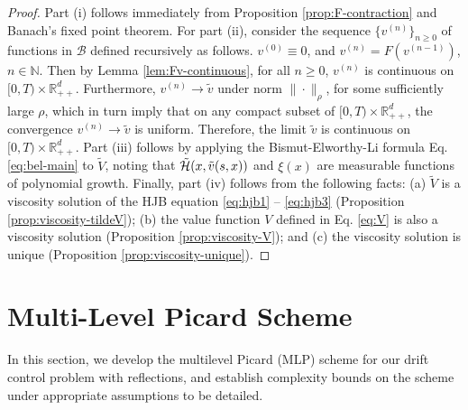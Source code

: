 \documentclass[11pt]{article}
\theoremstyle{definition}
\theoremstyle{plain}
\newcommand{\R}{\mathbb{R}}
\newcommand{\N}{\mathbb{N}}
\newcommand{\cH}{{\cal H}}
\begin{document}
\begin{proof} Part (i) follows immediately from Proposition \ref{prop:F-contraction} and Banach's fixed point theorem. 
For part (ii), consider the sequence $\{v^{(n)}\}_{n \geq 0}$ of functions in $\mathcal{B}$ defined recursively as follows. 
$v^{(0)} \equiv 0$, and $v^{(n)} = F(v^{(n-1)})$, $n \in \N$. 
Then by Lemma \ref{lem:Fv-continuous}, for all $n \ge 0$, $v^{(n)}$ is continuous on $[0,T)\times \R_{++}^d$. 
Furthermore, $v^{(n)} \to \tilde v$ under norm $\|\cdot\|_\rho$, for some sufficiently large $\rho$, 
which in turn imply that on any compact subset of $[0,T)\times \R_{++}^d$, 
the convergence $v^{(n)} \to \tilde v$ is uniform. Therefore, the limit $\tilde v$ is continuous on $[0,T)\times \R_{++}^d$. 
Part (iii) follows by applying the Bismut-Elworthy-Li formula Eq. \eqref{eq:bel-main} to $\tilde V$, noting that 
$\tilde \cH(x, \tilde{v}(s, x))$ and $\xi(x)$ are measurable functions of polynomial growth. 
Finally, part (iv) follows from the following facts: (a) $\tilde V$ is a viscosity solution 
of the HJB equation \eqref{eq:hjb1} -- \eqref{eq:hjb3} (Proposition \ref{prop:viscosity-tildeV}); 
(b) the value function $V$ defined in Eq. \eqref{eq:V} is also a viscosity solution (Proposition \ref{prop:viscosity-V}); 
and (c) the viscosity solution is unique (Proposition \ref{prop:viscosity-unique}). 
\end{proof}



\section{Multi-Level Picard Scheme}\label{sec:mlp}
In this section, we develop the multilevel Picard (MLP) scheme for our drift control problem with reflections, 
and establish complexity bounds on the scheme under appropriate assumptions to be detailed. 
\end{document}
